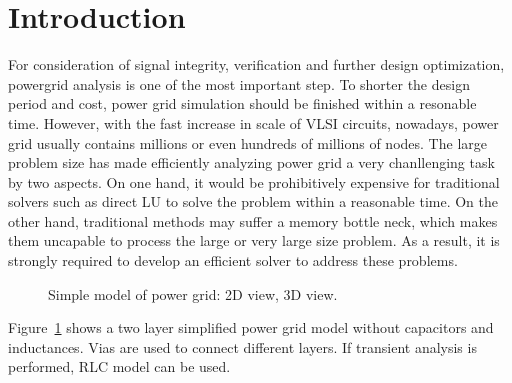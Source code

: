 \documentclass{sig-alternate}
\begin{document}
\section{Introduction}
	For consideration of signal integrity, verification and further design optimization, powergrid analysis is one of the most 
	important step. To shorter the design period and cost, power grid simulation should be finished within a resonable time. 
	However, with the fast increase in scale of VLSI circuits, nowadays, power grid usually contains millions or even hundreds 
	of millions of nodes. The large problem size has made efficiently analyzing power grid a very chanllenging task by two aspects. 
	On one hand, it would be prohibitively expensive for traditional solvers such as 
	direct LU to solve the problem within a reasonable time. On the other hand, traditional methods may suffer a memory bottle 
	neck, which makes them uncapable to process the large or very large size problem. As a result, it is strongly required to 
	develop an efficient solver to address these problems.\\
	\begin{figure}[htbp]
	  \caption{Simple model of power grid: 
	   2D view,
	   3D view.}
	  \label{pg_model}
	\end{figure}

	Figure~\ref{pg_model} shows a two layer simplified power grid model without capacitors and inductances. Vias are used to 
	connect different layers. If transient analysis is performed, RLC model can be used.\\ 
\end{document}
